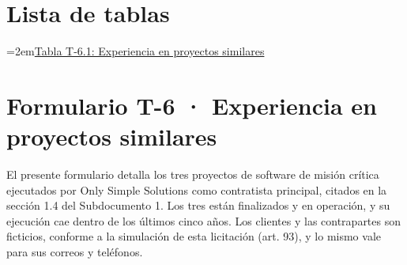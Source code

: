 \documentclass[11pt]{article}
\begin{document}

\tableofcontents
\clearpage
\section*{Lista de tablas}

\noindent\hangindent=2em\hyperref[tab:formulario-t6]{Tabla T-6.1: Experiencia en proyectos similares}\dotfill\pageref{tab:formulario-t6}\par\vspace{0.4\baselineskip}
\clearpage


\section{Formulario T-6 · Experiencia en proyectos similares}\label{formulario-t-6}

El presente formulario detalla los tres proyectos de software de misión crítica ejecutados por Only Simple Solutions como contratista principal, citados en la sección 1.4 del Subdocumento 1. Los tres están finalizados y en operación, y su ejecución cae dentro de los últimos cinco años. Los clientes y las contrapartes son ficticios, conforme a la simulación de esta licitación (art. 93), y lo mismo vale para sus correos y teléfonos.

\renewcommand{\tablename}{Tabla}
\renewcommand{\thetable}{T-6.\arabic{table}}
\end{document}
